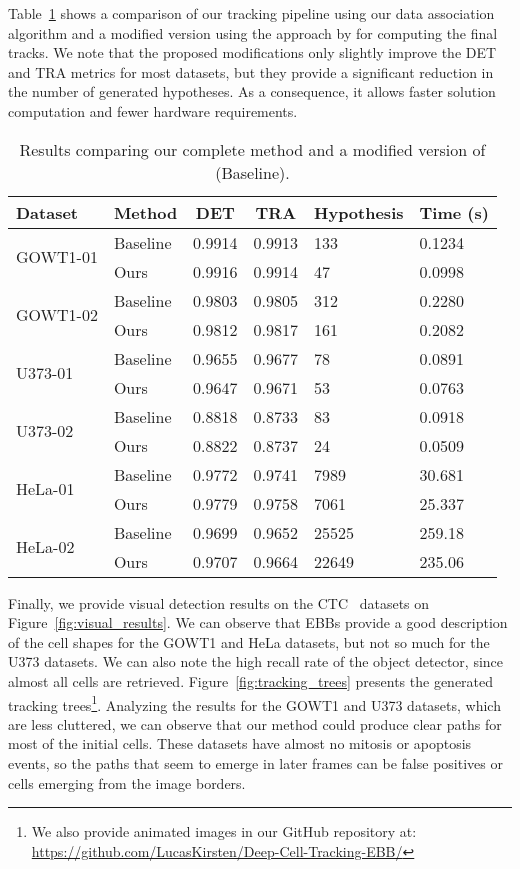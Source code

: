 \documentclass{article}
\begin{document}
Table~\ref{tab:bise_comparison} shows a comparison of our tracking pipeline using our data association algorithm and a modified version using the approach by \cite{bise} for computing the final tracks. We note that the proposed modifications only slightly improve the DET and TRA metrics for most datasets, but they provide a significant reduction in the number of generated hypotheses. As a consequence, it allows faster solution computation and fewer hardware requirements.

\begin{table}[]
\centering
\caption[Results comparing our complete method and a modified version of \cite{bise}.]{Results comparing our complete method and a modified version of \cite{bise} (Baseline).}
\begin{tabular}{l|l|llll}
Dataset & Method & \multicolumn{1}{c}{DET} & \multicolumn{1}{c}{TRA} & Hypothesis & Time (s) \\ \hline
\multicolumn{1}{c|}{\multirow{2}{*}{GOWT1-01}} & Baseline & 0.9914 & 0.9913 & 133 & 0.1234 \\
\multicolumn{1}{c|}{} & Ours & 0.9916 & 0.9914 & 47 & 0.0998 \\ \hline
\multicolumn{1}{c|}{\multirow{2}{*}{GOWT1-02}} & Baseline & 0.9803 & 0.9805 & 312 & 0.2280 \\
\multicolumn{1}{c|}{} & Ours & 0.9812 & 0.9817 & 161 & 0.2082 \\ \hline
\multirow{2}{*}{U373-01} & Baseline & 0.9655 & 0.9677 & 78 & 0.0891 \\
 & Ours & 0.9647 & 0.9671 & 53 & 0.0763 \\ \hline
\multirow{2}{*}{U373-02} & Baseline & 0.8818 & 0.8733 & 83 & 0.0918 \\
 & Ours & 0.8822 & 0.8737 & 24 & 0.0509 \\ \hline
\multirow{2}{*}{HeLa-01} & Baseline & 0.9772 & 0.9741 & 7989 & 30.681 \\
 & Ours & 0.9779 & 0.9758 & 7061 & 25.337 \\ \hline
\multirow{2}{*}{HeLa-02} & Baseline & 0.9699 & 0.9652 & 25525 & 259.18 \\
 & Ours & 0.9707 & 0.9664 & 22649 & 235.06
\end{tabular}
\label{tab:bise_comparison}
\end{table}

Finally, we provide visual detection results on the CTC~\cite{isbi} datasets on Figure~\ref{fig:visual_results}. We can observe that EBBs provide a good description of the cell shapes for the GOWT1 and HeLa datasets, but not so much for the U373 datasets. We can also note the high recall rate of the object detector, since almost all cells are retrieved. Figure~\ref{fig:tracking_trees} presents the generated tracking trees\footnote{We also provide animated images in our GitHub repository at: \url{https://github.com/LucasKirsten/Deep-Cell-Tracking-EBB/}}. Analyzing the results for the GOWT1 and U373 datasets, which are less cluttered, we can observe that our method could produce clear paths for most of the initial cells. These datasets have almost no mitosis or apoptosis events, so the paths that seem to emerge in later frames can be false positives or cells emerging from the image borders.
\end{document}
